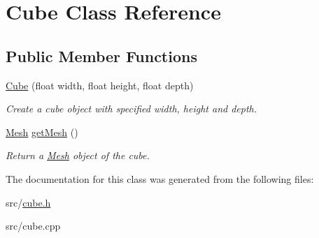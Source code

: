 \hypertarget{classCube}{}\section{Cube Class Reference}
\label{classCube}
\subsection*{Public Member Functions}
\begin{DoxyCompactItemize}
\item 
\hyperlink{classCube_abd4b65a1fae416c04f2a97ff188c9110}{Cube} (float width, float height, float depth)\hypertarget{classCube_abd4b65a1fae416c04f2a97ff188c9110}{}\label{classCube_abd4b65a1fae416c04f2a97ff188c9110}

\begin{DoxyCompactList}\small\item\em Create a cube object with specified width, height and depth. \end{DoxyCompactList}\item 
\hyperlink{classMesh}{Mesh} \hyperlink{classCube_a16590bea0a2e21a9a068d9f17a5f9c59}{get\+Mesh} ()\hypertarget{classCube_a16590bea0a2e21a9a068d9f17a5f9c59}{}\label{classCube_a16590bea0a2e21a9a068d9f17a5f9c59}

\begin{DoxyCompactList}\small\item\em Return a \hyperlink{classMesh}{Mesh} object of the cube. \end{DoxyCompactList}\end{DoxyCompactItemize}


The documentation for this class was generated from the following files\+:\begin{DoxyCompactItemize}
\item 
src/\hyperlink{cube_8h}{cube.\+h}\item 
src/cube.\+cpp\end{DoxyCompactItemize}
